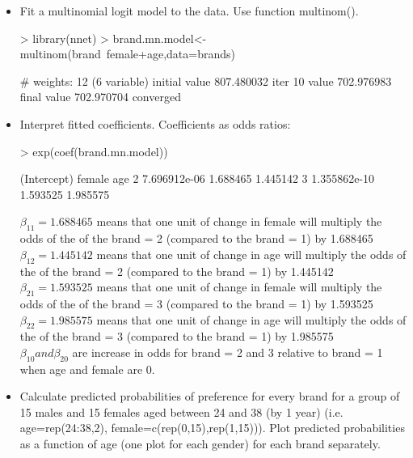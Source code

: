 \documentclass[a4paper]{article}
\begin{document}
\begin{itemize}
\item Fit a multinomial logit model to the data. Use function multinom().
\begin{Schunk}
\begin{Sinput}
> library(nnet)
> brand.mn.model<-multinom(brand~female+age,data=brands)
\end{Sinput}
\begin{Soutput}
# weights:  12 (6 variable)
initial  value 807.480032 
iter  10 value 702.976983
final  value 702.970704 
converged
\end{Soutput}
\end{Schunk}
\item Interpret fitted coefficients.
Coefficients as odds ratios:
\begin{Schunk}
\begin{Sinput}
> exp(coef(brand.mn.model))
\end{Sinput}
\begin{Soutput}
   (Intercept)   female      age
2 7.696912e-06 1.688465 1.445142
3 1.355862e-10 1.593525 1.985575
\end{Soutput}
\end{Schunk}
$\beta_{11} = 1.688465$ means that one unit of change in female will multiply
the odds of the of the brand = 2 (compared to the brand = 1) by 1.688465\\
$\beta_{12} = 1.445142$ means that one unit of change in age will multiply
the odds of the of the brand = 2 (compared to the brand = 1) by 1.445142\\
$\beta_{21} = 1.593525$ means that one unit of change in female will multiply
the odds of the of the brand = 3 (compared to the brand = 1) by 1.593525\\
$\beta_{22} = 1.985575$ means that one unit of change in age will multiply
the odds of the of the brand = 3 (compared to the brand = 1) by 1.985575\\
$\beta_{10} and \beta_{20}$ are increase in odds for brand = 2 and 3 relative to
brand = 1 when age and female are 0.
\item Calculate predicted probabilities of preference for every brand for a group of 15 males and 15 females aged between 24 and 38 (by 1 year) 
(i.e. age=rep(24:38,2), female=c(rep(0,15),rep(1,15))).
Plot predicted probabilities as a function of age (one plot for each gender) for each brand separately.


\end{itemize}
\end{document}

